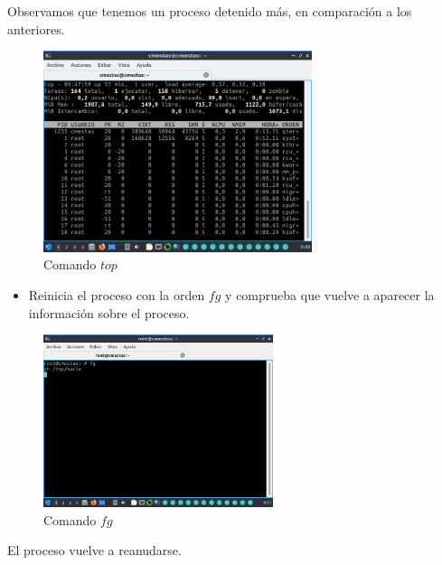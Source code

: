 \documentclass[12pt]{article}
\begin{document}
\clearpage
\newpage

Observamos que tenemos un proceso detenido más, en comparación a los anteriores.

\begin{figure}[h]
    \centering
    \includegraphics[width=0.7\textwidth]{images/screenA12.jpg}
    \caption{Comando $top$}
\end{figure}

\begin{itemize}
    \item Reinicia el proceso con la orden $fg$ y comprueba que vuelve a aparecer la información sobre el proceso.
\end{itemize}

\begin{figure}[h]
    \centering
    \includegraphics[width=0.6\textwidth]{images/screenA13.jpg}
    \caption{Comando $fg$}
\end{figure}

\clearpage
\newpage

El proceso vuelve a reanudarse.
\end{document}
